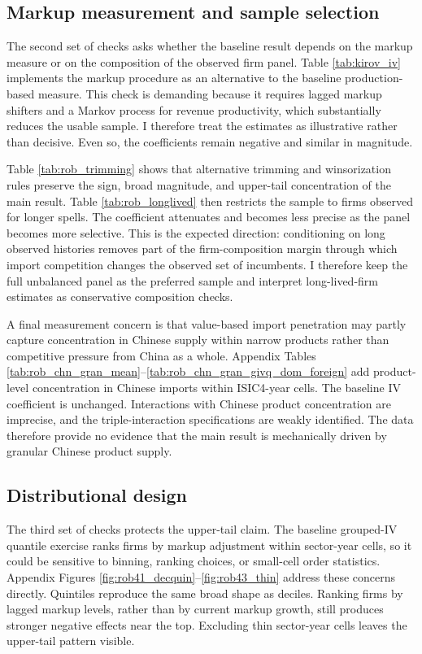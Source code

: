 ﻿\documentclass[12pt]{article}
\begin{document}
\subsection{Markup measurement and sample selection}

The second set of checks asks whether the baseline result depends on the markup measure or on the composition of the observed firm panel. Table \ref{tab:kirov_iv} implements the \textcite{kirovMeasuringMarkupsRevenue2026} markup procedure as an alternative to the baseline production-based measure. This check is demanding because it requires lagged markup shifters and a Markov process for revenue productivity, which substantially reduces the usable sample. I therefore treat the estimates as illustrative rather than decisive. Even so, the coefficients remain negative and similar in magnitude.

Table \ref{tab:rob_trimming} shows that alternative trimming and winsorization rules preserve the sign, broad magnitude, and upper-tail concentration of the main result. Table \ref{tab:rob_longlived} then restricts the sample to firms observed for longer spells. The coefficient attenuates and becomes less precise as the panel becomes more selective. This is the expected direction: conditioning on long observed histories removes part of the firm-composition margin through which import competition changes the observed set of incumbents. I therefore keep the full unbalanced panel as the preferred sample and interpret long-lived-firm estimates as conservative composition checks.

A final measurement concern is that value-based import penetration may partly capture concentration in Chinese supply within narrow products rather than competitive pressure from China as a whole. Appendix Tables \ref{tab:rob_chn_gran_mean}--\ref{tab:rob_chn_gran_givq_dom_foreign} add product-level concentration in Chinese imports within ISIC4-year cells. The baseline IV coefficient is unchanged. Interactions with Chinese product concentration are imprecise, and the triple-interaction specifications are weakly identified. The data therefore provide no evidence that the main result is mechanically driven by granular Chinese product supply.

\subsection{Distributional design}

The third set of checks protects the upper-tail claim. The baseline grouped-IV quantile exercise ranks firms by markup adjustment within sector-year cells, so it could be sensitive to binning, ranking choices, or small-cell order statistics. Appendix Figures \ref{fig:rob41_decquin}--\ref{fig:rob43_thin} address these concerns directly. Quintiles reproduce the same broad shape as deciles. Ranking firms by lagged markup levels, rather than by current markup growth, still produces stronger negative effects near the top. Excluding thin sector-year cells leaves the upper-tail pattern visible.
\end{document}

